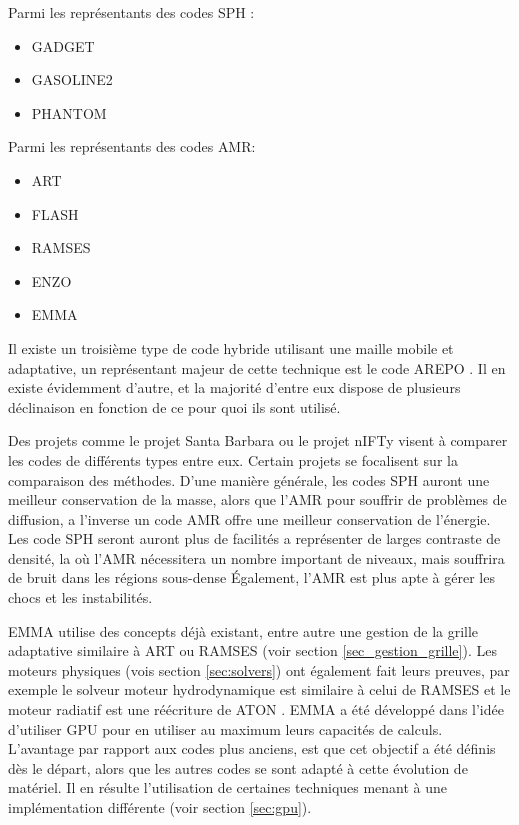 Parmi les représentants des codes \ac{SPH} :
\begin{itemize}
\item GADGET \citep{springel_cosmological_2005}
\item GASOLINE2 \citep{2017arXiv170703824W}
\item PHANTOM \citep{2017arXiv170203930P}
\end{itemize}

Parmi les représentants des codes \ac{AMR}:
\begin{itemize}
\item ART \citep{1997ApJS..111...73K}
\item FLASH \citep{0067-0049-131-1-273}
\item RAMSES \citep{teyssier_cosmological_2002}
\item ENZO \citep{bryan_enzo:_2014}
\item EMMA \citep{aubert_emma:_2015}
\end{itemize}

Il existe un troisième type de code hybride utilisant une maille mobile et adaptative, un représentant majeur de cette technique est le code AREPO \citep{2010MNRAS.401..791S}.
Il en existe évidemment d'autre, et la majorité d'entre eux dispose de plusieurs déclinaison en fonction de ce pour quoi ils sont utilisé.

Des projets comme le projet Santa Barbara \citep{1999ApJ...525..554F} ou le projet nIFTy \citep{sembolini_nifty_2015} visent à comparer les codes de différents types entre eux.
Certain projets \citep{2007MNRAS.380..963A, oshea_comparing_2005} se focalisent sur la comparaison des méthodes.
D'une manière générale, les codes \ac{SPH} auront une meilleur conservation de la masse, alors que l'\ac{AMR} pour souffrir de problèmes de diffusion, a l'inverse un code \ac{AMR} offre une meilleur conservation de l’énergie.
Les code \ac{SPH} seront auront plus de facilités a représenter de larges contraste de densité, la où l'\ac{AMR} nécessitera un nombre important de niveaux, mais souffrira de bruit dans les régions sous-dense
Également, l'\ac{AMR} est plus apte à gérer les chocs et les instabilités.

EMMA utilise des concepts déjà existant, entre autre une gestion de la grille adaptative similaire à ART ou RAMSES (voir section \ref{sec_gestion_grille}).
Les moteurs physiques (vois section \ref{sec:solvers}) ont également fait leurs preuves, par exemple le solveur moteur hydrodynamique est similaire à celui de RAMSES et le moteur radiatif est une réécriture de ATON \citep{aubert_radiative_2008}.
EMMA a été développé dans l'idée d'utiliser \ac{GPU} pour en utiliser au maximum leurs capacités de calculs.
L'avantage par rapport aux codes plus anciens, est que cet objectif a été définis dès le départ, alors que les autres codes se sont adapté à cette évolution de matériel.
Il en résulte l'utilisation de certaines techniques menant à une implémentation différente (voir section \ref{sec:gpu}).


